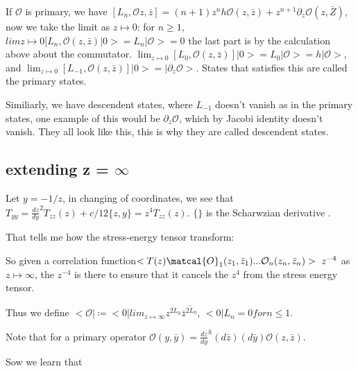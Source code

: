\documentclass[12pt]{article}%
\theoremstyle{definition}
\theoremstyle{remark}
\theoremstyle{definition}
\theoremstyle{definition}
\newcommand{\zto}{\lim_{z\mapsto 0}}
\newcommand{\ozz}{\mathcal{O}(z,\bar{z})}
\newcommand{\curlyo}{\mathcal{O}}
\begin{document}
    If $\mathcal{O}$ is primary, we have $[L_n, \mathcal{O}z,\bar{z}] = (n+1)z^n h \mathcal{O}(z,\bar{z}) + z^{n+1} \partial_z \mathcal{O}(z, \bar{Z})$, now we take the limit as $z \mapsto 0$: for $n \geq 1$, $lim{z\mapsto 0} [L_n, \mathcal{O}(z,\bar{z}) |0> = L_n |\mathcal{O}> = 0$ the last part is by the calculation above about the commutator. $\zto [L_0, \ozz]|0> = L_0 |\mathcal{O}> = h|\mathcal{O}>$, and $\zto [L_{-1}, \ozz] |0> = |\partial_z \curlyo>$. States that satisfies this are called the primary states.

    Similiarly, we have descendent states, where $L_{-1}$ doesn't vanish as in the primary states, one example of this would be $\partial_z \curlyo$, which by Jacobi identity doesn't vanish. They all look like this, this is why they are called descendent states.

    \subsection{extending z = $\infty$}

    Let $y = -1/z$, in changing of coordinates, we see that $T_{yy}= \frac{dz}{dy}^2 T_{zz}(z) + c/12 \{z,y\} = z^4T_{zz}(z)$. $\{\}$ is the Scharwzian derivative .

    That tells me how the stress-energy tensor transform:

    So given a correlation function$<T(z) \matcal{O}_1(z_1, \bar{z}_1)...\mathcal{O}_n(z_n, \bar{z}_n)> ~ z^{-4}$ as $z \mapsto \infty$, the $z^{-4}$ is there to ensure that it cancels the $z^4$ from the stress energy tensor.

    Thus we define $<\mathcal{O}| \coloneqq <0| lim_{z\mapsto \infty} z^{2L_0}\bar{z}^{2\tilde{L}_0}$, $<0|L_n = 0 for n \leq 1$.

    Note that for a primary operator $\mathcal{O}(y,\bar{y}) = \frac{dz}{dy}^h (d\bar{z})(d\bar{y})\ozz$.

    Sow we learn that
\end{document}
